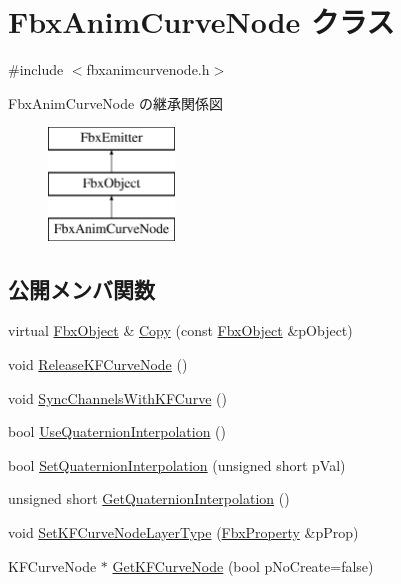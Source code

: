\hypertarget{class_fbx_anim_curve_node}{}\section{Fbx\+Anim\+Curve\+Node クラス}
\label{class_fbx_anim_curve_node}


{\ttfamily \#include $<$fbxanimcurvenode.\+h$>$}

Fbx\+Anim\+Curve\+Node の継承関係図\begin{figure}[H]
\begin{center}
\leavevmode
\includegraphics[height=3.000000cm]{class_fbx_anim_curve_node}
\end{center}
\end{figure}
\subsection*{公開メンバ関数}
\begin{DoxyCompactItemize}
\item 
virtual \hyperlink{class_fbx_object}{Fbx\+Object} \& \hyperlink{class_fbx_anim_curve_node_a9630a96fb6927737ff49d6dab352c36f}{Copy} (const \hyperlink{class_fbx_object}{Fbx\+Object} \&p\+Object)
\item 
void \hyperlink{class_fbx_anim_curve_node_ad38a2414969d07dd7c1905fb8d07a9b5}{Release\+K\+F\+Curve\+Node} ()
\item 
void \hyperlink{class_fbx_anim_curve_node_aa52265be388b803f8880e1911e211236}{Sync\+Channels\+With\+K\+F\+Curve} ()
\item 
bool \hyperlink{class_fbx_anim_curve_node_a431f4ad514b9c72efc78c1f16dc50b6b}{Use\+Quaternion\+Interpolation} ()
\item 
bool \hyperlink{class_fbx_anim_curve_node_a16fee78283fbd1d530e1e80a2bcb166a}{Set\+Quaternion\+Interpolation} (unsigned short p\+Val)
\item 
unsigned short \hyperlink{class_fbx_anim_curve_node_aef47daaf7f219b58537fcd4e40adee38}{Get\+Quaternion\+Interpolation} ()
\item 
void \hyperlink{class_fbx_anim_curve_node_a9d266fe30162053141dd131a1005abf2}{Set\+K\+F\+Curve\+Node\+Layer\+Type} (\hyperlink{class_fbx_property}{Fbx\+Property} \&p\+Prop)
\item 
K\+F\+Curve\+Node $\ast$ \hyperlink{class_fbx_anim_curve_node_a482d23e7517db05af3252b2c02ce2415}{Get\+K\+F\+Curve\+Node} (bool p\+No\+Create=false)
\end{DoxyCompactItemize}
